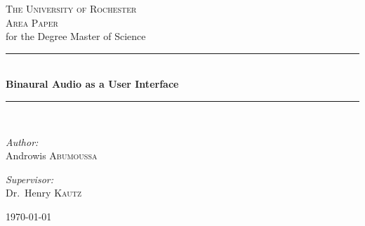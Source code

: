 \documentclass[12pt]{report}
\newcommand{\HRule}{\rule{\linewidth}{0.5mm}}
\begin{document}
\begin{titlepage}
\begin{center}

\textsc{\LARGE The University of Rochester}
\\[5.5cm]

\textsc{\Large Area Paper}\\
for the Degree Master of Science
\\[0.5cm]

\HRule \\[0.4cm]
{ \large \bfseries Binaural Audio as a User Interface }\\[0.4cm]

\HRule \\[0.5cm]

\begin{minipage}{0.4\textwidth}
\begin{flushleft} \large
\emph{Author:}\\
Androwis \textsc{Abumoussa}
\end{flushleft}
\end{minipage}
\begin{minipage}{0.4\textwidth}
\begin{flushright} \large
\emph{Supervisor:} \\
Dr.~Henry \textsc{Kautz}
\end{flushright}
\end{minipage}

\vfill

{\large \today}

\end{center}
\end{titlepage}



\renewcommand{\thepage }{\roman{page}}                         \tableofcontents



\newpage \thispagestyle{empty} \quad
\end{document}
